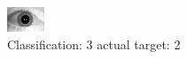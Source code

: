 \begin{figure}[h!]
\begin{center}
\includegraphics[width=0.60\columnwidth]{figures/ID1748_class_3_target_2.png}
\end{center}
\caption{ Classification: 3 actual target: 2}
\label{fig:ID1748_class_3_target_2}
\end{figure}
